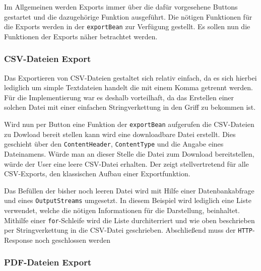 Im Allgemeinen werden Exports immer über die dafür vorgesehene Buttons gestartet und die dazugehörige Funktion ausgeführt.
Die nötigen Funktionen für die Exports werden in der \texttt{exportBean} zur Verfügung gestellt.
Es sollen nun die Funktionen der Exports näher betrachtet werden.

\subsubsection{CSV-Dateien Export}

Das Exportieren von CSV-Dateien gestaltet sich relativ einfach, da es sich hierbei lediglich um simple Textdateien handelt die mit einem Komma getrennt werden.
Für die Implementierung war es deshalb vorteilhaft, da das Erstellen einer solchen Datei mit einer einfachen Stringverkettung in den Griff zu bekommen ist.

Wird nun per Button eine Funktion der \texttt{exportBean} aufgerufen die CSV-Dateien zu Dowload bereit stellen kann wird eine downloadbare Datei erstellt. Dies geschieht über den \texttt{ContentHeader}, \texttt{ContentType} und die Angabe eines Dateinamens.
Würde man an dieser Stelle die Datei zum Download bereitstellen, würde der User eine leere CSV-Datei erhalten.
Der  zeigt stellvertretend für alle CSV-Exports, den klassischen Aufbau einer Exportfunktion.

		

Das Befüllen der bisher noch leeren Datei wird mit Hilfe einer Datenbankabfrage und eines \texttt{OutputStreams} umgesetzt.
In diesem Beispiel wird lediglich eine Liste verwendet, welche die nötigen Informationen für die Darstellung, beinhaltet.
Mithilfe einer \texttt{for}-Schleife wird die Liste durchiterriert und wie oben beschrieben per Stringverkettung in die CSV-Datei geschrieben.
Abschließend muss der \texttt{HTTP}-Response noch geschlossen werden
	
\subsubsection{PDF-Dateien Export}

